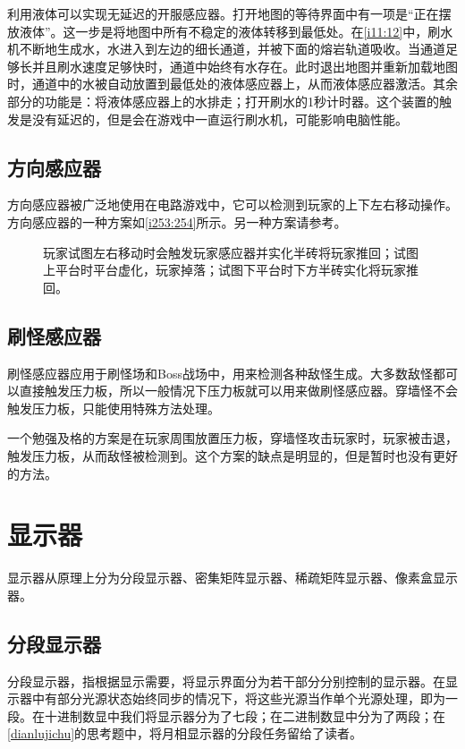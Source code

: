 利用液体可以实现无延迟的开服感应器。打开地图的等待界面中有一项是“正在摆放液体”。这一步是将地图中所有不稳定的液体转移到最低处。在\autoref{i11:12}中，刷水机不断地生成水，水进入到左边的细长通道，并被下面的熔岩轨道吸收。当通道足够长并且刷水速度足够快时，通道中始终有水存在。此时退出地图并重新加载地图时，通道中的水被自动放置到最低处的液体感应器上，从而液体感应器激活。其余部分的功能是：将液体感应器上的水排走；打开刷水的1秒计时器。这个装置的触发是没有延迟的，但是会在游戏中一直运行刷水机，可能影响电脑性能。

\subsection{方向感应器}
方向感应器被广泛地使用在电路游戏中，它可以检测到玩家的上下左右移动操作。方向感应器的一种方案如\autoref{i253:254}所示。另一种方案请参考。

\begin{figure}[!ht]
	\centering
	\caption{玩家试图左右移动时会触发玩家感应器并实化半砖将玩家推回；试图上平台时平台虚化，玩家掉落；试图下平台时下方半砖实化将玩家推回。}
	\label{i253:254}
\end{figure}

\subsection{刷怪感应器}
刷怪感应器应用于刷怪场和Boss战场中，用来检测各种敌怪生成。大多数敌怪都可以直接触发压力板，所以一般情况下压力板就可以用来做刷怪感应器。穿墙怪不会触发压力板，只能使用特殊方法处理。

一个勉强及格的方案是在玩家周围放置压力板，穿墙怪攻击玩家时，玩家被击退，触发压力板，从而敌怪被检测到。这个方案的缺点是明显的，但是暂时也没有更好的方法。

\section{显示器}
显示器从原理上分为分段显示器、密集矩阵显示器、稀疏矩阵显示器、像素盒显示器。

\subsection{分段显示器}
分段显示器，指根据显示需要，将显示界面分为若干部分分别控制的显示器。在显示器中有部分光源状态始终同步的情况下，将这些光源当作单个光源处理，即为一段。在十进制数显中我们将显示器分为了七段；在二进制数显中分为了两段；在\autoref{dianlujichu}的思考题中，将月相显示器的分段任务留给了读者。

